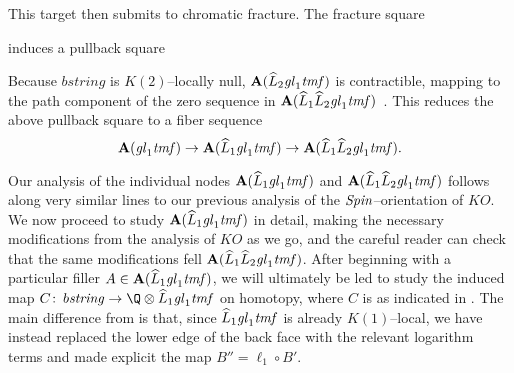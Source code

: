 This target then submits to chromatic fracture.  The fracture square
\begin{center}
\end{center}
induces a pullback square
\begin{center}
\end{center}
Because \(b\mathit{string}\) is \(K(2)\)--locally null, \(\mathbf A(\widehat L_2 \mathit{gl}_1 \mathit{tmf})\) is contractible, mapping to the path component of the zero sequence in \(\mathbf A(\widehat L_1 \widehat L_2 \mathit{gl}_1 \mathit{tmf})\)~\cite[Proposition 13.7]{AHR}.  This reduces the above pullback square to a fiber sequence \[\mathbf A(\mathit{gl}_1 \mathit{tmf}) \to \mathbf A(\widehat L_1 \mathit{gl}_1 \mathit{tmf}) \to \mathbf A(\widehat L_1 \widehat L_2 \mathit{gl}_1 \mathit{tmf}).\]

Our analysis of the individual nodes \(\mathbf A(\widehat L_1 \mathit{gl}_1 \mathit{tmf})\) and \(\mathbf A(\widehat L_1 \widehat L_2 \mathit{gl}_1 \mathit{tmf})\) follows along very similar lines to our previous analysis of the \(\mathit{Spin}\)--orientation of \(KO\).  We now proceed to study \(\mathbf A(\widehat L_1 \mathit{gl}_1 \mathit{tmf})\) in detail, making the necessary modifications from the analysis of \(KO\) as we go, and the careful reader can check that the same modifications fell \(\mathbf A(\widehat L_1 \widehat L_2 \mathit{gl}_1 \mathit{tmf})\).  After beginning with a particular filler \(A \in \mathbf A(\widehat L_1 \mathit{gl}_1 \mathit{tmf})\), we will ultimately be led to study the induced map \(C\co b\mathit{string} \to \Q \otimes \widehat L_1 \gl_1 \tmf\) on homotopy, where \(C\) is as indicated in .  The main difference from  is that, since \(\widehat L_1 \mathit{gl}_1 \mathit{tmf}\) is already \(K(1)\)--local, we have instead replaced the lower edge of the back face with the relevant logarithm terms and made explicit the map \(B'' = \ell_1 \circ B'\).

